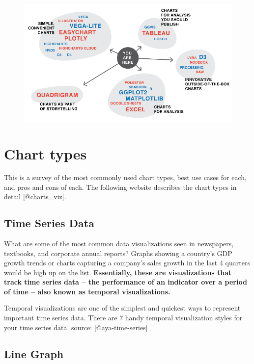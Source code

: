 \documentclass[]{book}
\theoremstyle{definition}
\theoremstyle{definition}
\theoremstyle{definition}
\theoremstyle{remark}
\begin{document}
\begin{figure}
\centering
\includegraphics{images/tools_force_paths.png}
\caption{}
\end{figure}

\section{Chart types}\label{chart-types}

This is a survey of the most commonly used chart types, best use cases
for each, and pros and cons of each. The following website describes the
chart types in detail {[}@charts\_viz{]}.

\subsection{Time Series Data}\label{time-series-data}

What are some of the most common data visualizations seen in newspapers,
textbooks, and corporate annual reports? Graphs showing a country's GDP
growth trends or charts capturing a company's sales growth in the last 4
quarters would be high up on the list. \textbf{Essentially, these are
visualizations that track time series data -- the performance of an
indicator over a period of time -- also known as temporal
visualizations.}

Temporal visualizations are one of the simplest and quickest ways to
represent important time series data. There are 7 handy temporal
visualization styles for your time series data. source:
{[}@aya-time-series{]}

\subsection{Line Graph}\label{line-graph}
\end{document}
